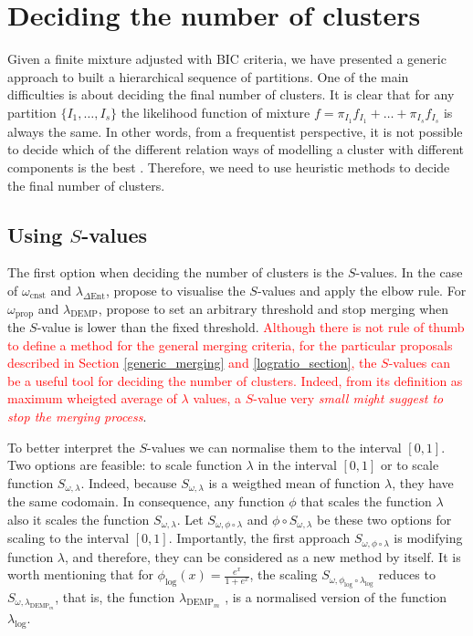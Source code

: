 \documentclass[submit]{smj}
\theoremstyle{definition}
\begin{document}
\section{Deciding the number of clusters}\label{number_clusters}

Given a finite mixture adjusted with BIC criteria, we have presented a generic approach to built a hierarchical sequence of partitions. One of the main difficulties is about deciding the final number of clusters. It is clear that for any partition $\{I_1, \dots, I_{s}\}$ the likelihood function of mixture $f = \pi_{I_1} f_{I_1} + \dots + \pi_{I_s} f_{I_s}$ is always the same. In other words, from a frequentist perspective, it is not possible to decide which of the different relation ways of modelling a cluster with different components is the best  \citep{hennig2010methods}. Therefore, we need to use heuristic methods to decide the final number of clusters.

\subsection{Using $S$-values}

The first option when deciding the number of clusters is the $S$-values. In the case of $\omega_{\text{cnst}}$ and $\lambda_{\Delta\text{Ent}}$, \cite{baudry2010combining} propose to visualise the $S$-values and apply the elbow rule. For $\omega_{\text{prop}}$ and $\lambda_{\text{DEMP}}$, \cite{hennig2010methods} propose to set an arbitrary threshold and stop merging when the $S$-value is lower than the fixed threshold. \textcolor{red}{Although there is not rule of thumb to define a method for the general merging criteria, for the particular proposals described in Section \ref{generic_merging} and \ref{logratio_section}, the $S$-values can be a useful tool for deciding the number of clusters. Indeed, from its definition as maximum wheigted average of $\lambda$ values, a $S$-value very \it{small} might suggest to stop the merging process}.

To better interpret the $S$-values we can normalise them to the interval $\left[0,1\right]$. Two options are feasible: to scale function $\lambda$ in the interval $\left[0,1\right]$ or to scale function $S_{\omega, \lambda}$. Indeed, because $S_{\omega, \lambda}$ is a weigthed mean of function $\lambda$, they have the same codomain. In consequence, any function $\phi$ that scales the function $\lambda$ also it scales the function $S_{\omega, \lambda}$. Let $S_{\omega, \phi \circ \lambda}$ and $\phi \circ S_{\omega, \lambda}$ be these two options for scaling to the interval $\left[0,1\right]$. Importantly, the first approach $S_{\omega, \phi \circ \lambda}$ is modifying function $\lambda$, and therefore, they can be considered as a new method by itself. It is worth mentioning that for $\phi_{\log}(x)=\frac{e^x}{1+e^x}$, the scaling $S_{\omega, \phi_{\log} \circ \lambda_{\log}}$ reduces to $S_{\omega, \lambda_{\text{DEMP}_m}}$, that is, the  function $\lambda_{\text{DEMP}_m}$ \citep{longford2014}, is a normalised version of the function $\lambda_{\log}$.
\end{document}
